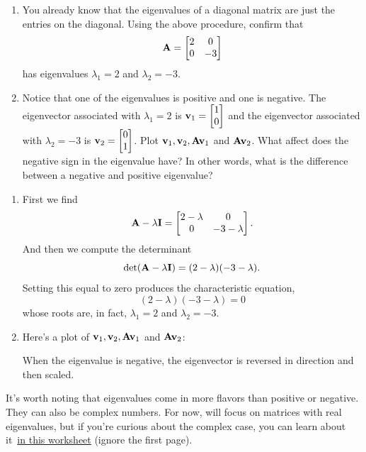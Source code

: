 \begin{prob}
\begin{enumerate}
    \item You already know that the eigenvalues of a diagonal matrix are just the entries on the diagonal. Using the above procedure, confirm that
\[ \mathbf{A} = \begin{bmatrix} 2 & 0 \\ 0 & -3\end{bmatrix} \]
has eigenvalues $\lambda_1=2$ and $\lambda_2=-3$.
\item Notice that one of the eigenvalues is positive and one is negative. The eigenvector associated with $\lambda_1=2$ is $\mathbf{v}_1=\begin{bmatrix} 1 \\ 0 \end{bmatrix}$ and the eigenvector associated with $\lambda_2=-3$ is $\mathbf{v}_2=\begin{bmatrix} 0 \\ 1 \end{bmatrix}$. Plot $\mathbf{v}_1,\mathbf{v}_2,\mathbf{A}\mathbf{v}_1$ and $\mathbf{A}\mathbf{v}_2$. What affect does the negative sign in the eigenvalue have? In other words, what is the difference between a negative and positive eigenvalue?
\end{enumerate}
\end{prob}
\begin{sol}
\begin{enumerate}
\item First we find
$$\mathbf{A} - \lambda\mathbf{I} = \begin{bmatrix} 2-\lambda & 0 \\ 0 & -3-\lambda\end{bmatrix}.$$
And then we compute the determinant
$$\det(\mathbf{A}-\lambda\mathbf{I})=(2-\lambda)(-3-\lambda).$$
Setting this equal to zero produces the characteristic equation,
$$(2-\lambda)(-3-\lambda)=0$$
whose roots are, in fact, $\lambda_1=2$ and $\lambda_2=-3$.
\item Here's a plot of $\mathbf{v}_1,\mathbf{v}_2,\mathbf{A}\mathbf{v}_1$ and $\mathbf{A}\mathbf{v}_2$:
    \begin{center}
    \end{center}
    When the eigenvalue is negative, the eigenvector is reversed in direction and then scaled.
\end{enumerate}
\end{sol}

It's worth noting that eigenvalues come in more flavors than positive or negative. They can also be complex numbers. For now, will focus on matrices with real eigenvalues, but if you're curious about the complex case, you can learn about it~\href{https://www.google.com/url?sa=t&rct=j&q=&esrc=s&source=web&cd=17&cad=rja&uact=8&ved=2ahUKEwiX1J_x8cTnAhULxVkKHd2GBAQ4ChAWMAZ6BAgEEAE&url=https%3A%2F%2Fcanvas.harvard.edu%2Ffiles%2F5645480%2Fdownload%3Fdownload_frd%3D1&usg=AOvVaw3YkWN7j8kjPcIgHW4GaRH3}{in this worksheet} (ignore the first page).


